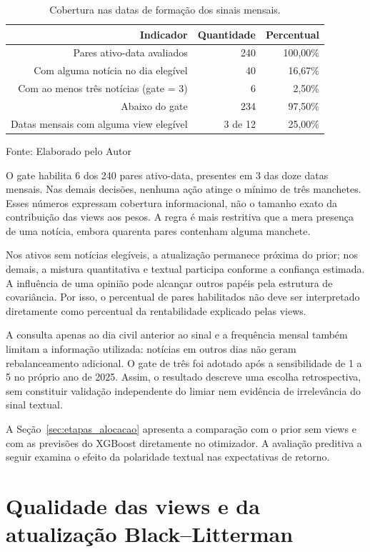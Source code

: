 \begin{table}[H]
\centering
\caption{Cobertura nas datas de formação dos sinais mensais.}
{\footnotesize
\begin{tabular}{@{}rrr@{}}
\hline
Indicador & Quantidade & Percentual \\ \hline
Pares ativo-data avaliados & 240 & 100,00\% \\
Com alguma notícia no dia elegível & 40 & 16,67\% \\
Com ao menos três notícias (gate = 3) & 6 & 2,50\% \\
Abaixo do gate & 234 & 97,50\% \\
Datas mensais com alguma view elegível & 3 de 12 & 25,00\% \\
\hline
\end{tabular}}
\par
Fonte: Elaborado pelo Autor
\end{table}
O gate habilita 6 dos 240 pares ativo-data, presentes em 3 das doze datas mensais. Nas demais decisões, nenhuma ação atinge o mínimo de três manchetes. Esses números expressam cobertura informacional, não o tamanho exato da contribuição das views aos pesos. A regra é mais restritiva que a mera presença de uma notícia, embora quarenta pares contenham alguma manchete.

Nos ativos sem notícias elegíveis, a atualização permanece próxima do prior; nos demais, a mistura quantitativa e textual participa conforme a confiança estimada. A influência de uma opinião pode alcançar outros papéis pela estrutura de covariância. Por isso, o percentual de pares habilitados não deve ser interpretado diretamente como percentual da rentabilidade explicado pelas views.

A consulta apenas ao dia civil anterior ao sinal e a frequência mensal também limitam a informação utilizada: notícias em outros dias não geram rebalanceamento adicional. O gate de três foi adotado após a sensibilidade de 1 a 5 no próprio ano de 2025. Assim, o resultado descreve uma escolha retrospectiva, sem constituir validação independente do limiar nem evidência de irrelevância do sinal textual.

A Seção~\ref{sec:etapas_alocacao} apresenta a comparação
com o prior sem views e com as previsões do XGBoost
diretamente no otimizador. A avaliação preditiva a seguir
examina o efeito da polaridade textual nas expectativas
de retorno.

\section{Qualidade das views e da atualização Black--Litterman}

